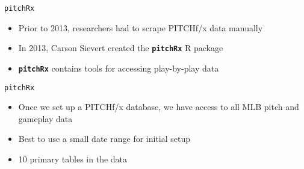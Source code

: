 \begin{frame}[fragile]{\texttt{pitchRx}}

\begin{itemize}

\item
  Prior to 2013, researchers had to scrape PITCHf/x data manually
\item
  In 2013, Carson Sievert created the \textbf{\texttt{pitchRx}} R
  package
\item
  \textbf{\texttt{pitchRx}} contains tools for accessing play-by-play
  data
\end{itemize}

\footnotesize

\begin{Shaded}
\begin{Highlighting}[]
\StringTok{ }\NormalTok{(}\NormalTok{, } \NormalTok{)}
\StringTok{ }\NormalTok{(}\NormalTok{, }\NormalTok{, }\NormalTok{)}
\NormalTok{(} \NormalTok{, } \NormalTok{, } 
   
\StringTok{ }\NormalTok{(}\NormalTok{)}
\end{Highlighting}
\end{Shaded}

\end{frame}

\begin{frame}{\texttt{pitchRx}}

\begin{itemize}

\item
  Once we set up a PITCHf/x database, we have access to all MLB pitch
  and gameplay data
\item
  Best to use a small date range for initial setup
\item
  10 primary tables in the data
\end{itemize}

\end{frame}

